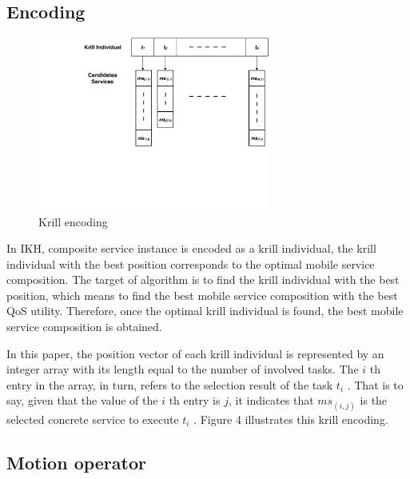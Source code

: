 \documentclass[10pt,journal,compsoc]{IEEEtran}
\begin{document}

\subsection{Encoding}

\begin{figure}[!t]
\centering
\includegraphics[width=3in]{./img/pic4.pdf}
\caption{Krill encoding}
\label{fig_opportunistic}
\end{figure}

In IKH, composite service instance is encoded as a krill individual, the krill individual with the best position corresponds to the optimal mobile service composition. The target of algorithm is to find the krill individual with the best position, which means to find the best mobile service composition with the best QoS utility. Therefore, once the optimal krill individual is found, the best mobile service composition is obtained.

In this paper, the position vector of each krill individual is represented by an integer array with its length equal to the number of involved tasks. The $i$ th entry in the array, in turn, refers to the selection result of the task $t_i$ . That is to say, given that the value of the $i$ th entry is $j$, it indicates that $ms_{(i,j)}$ is the selected concrete service to execute $t_i$ . Figure 4 illustrates this krill encoding.



\subsection{Motion operator}
% 
% 
\end{document}
